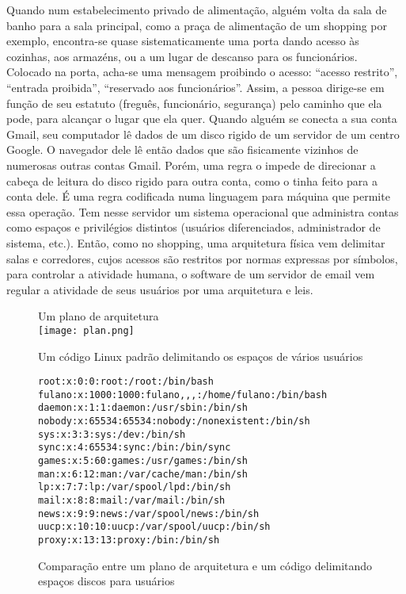 Quando num estabelecimento privado de alimentação, alguém volta da sala de banho para a sala principal, como a praça de alimentação de um shopping por exemplo, encontra-se quase sistematicamente uma porta dando acesso às cozinhas, aos armazéns, ou a um lugar de descanso para os funcionários. Colocado na porta, acha-se uma mensagem proibindo o acesso: “acesso restrito”, “entrada proibida”, “reservado aos funcionários”. Assim, a pessoa dirige-se em função de seu estatuto (freguês, funcionário, segurança) pelo caminho que ela pode, para alcançar o lugar que ela quer. Quando alguém se conecta a sua conta Gmail, seu computador lê dados de um disco rigido de um servidor de um centro Google. O navegador dele lê então dados que são fisicamente vizinhos de numerosas outras contas Gmail. Porém, uma regra o impede de direcionar a cabeça de leitura do disco rigido para outra conta, como o tinha feito para a conta dele. \'E uma regra codificada numa linguagem para máquina que permite essa operação. Tem nesse servidor um sistema operacional que administra contas como espaços e privilégios distintos (usuários diferenciados, administrador de sistema, etc.). Então, como no shopping, uma arquitetura física vem delimitar salas e corredores, cujos acessos são restritos por normas expressas por símbolos, para controlar a atividade humana, o software de um servidor de email vem regular a atividade de seus usuários por uma arquitetura e leis.

\begin{figure}[htb]
\caption{Comparação entre um plano de arquitetura e um código delimitando espaços discos para usuários} \label{fig2.3}

\begin{multicols}{2}

Um plano de arquitetura 
\\
\texttt{[image: plan.png]}

\columnbreak

Um código Linux padrão delimitando os espaços de vários usuários

{\scriptsize
\begin{verbatim}
root:x:0:0:root:/root:/bin/bash
fulano:x:1000:1000:fulano,,,:/home/fulano:/bin/bash
daemon:x:1:1:daemon:/usr/sbin:/bin/sh
nobody:x:65534:65534:nobody:/nonexistent:/bin/sh
sys:x:3:3:sys:/dev:/bin/sh
sync:x:4:65534:sync:/bin:/bin/sync
games:x:5:60:games:/usr/games:/bin/sh
man:x:6:12:man:/var/cache/man:/bin/sh
lp:x:7:7:lp:/var/spool/lpd:/bin/sh
mail:x:8:8:mail:/var/mail:/bin/sh
news:x:9:9:news:/var/spool/news:/bin/sh
uucp:x:10:10:uucp:/var/spool/uucp:/bin/sh
proxy:x:13:13:proxy:/bin:/bin/sh
\end{verbatim}
}
\end{multicols}
\end{figure}

